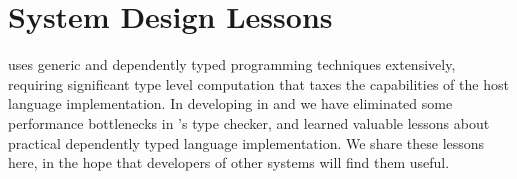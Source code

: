 \section{System Design Lessons}
\Frexlib{} uses generic and dependently typed programming techniques
extensively, requiring significant type level computation that taxes
the capabilities of the host language implementation.
%
In developing \Frexlib{} in \agda{} and \idris{} we have eliminated some
performance bottlenecks in \idris{}'s type checker, and learned valuable lessons
about practical dependently typed language implementation. We share these
lessons here, in the hope that developers of other systems will find them useful.



